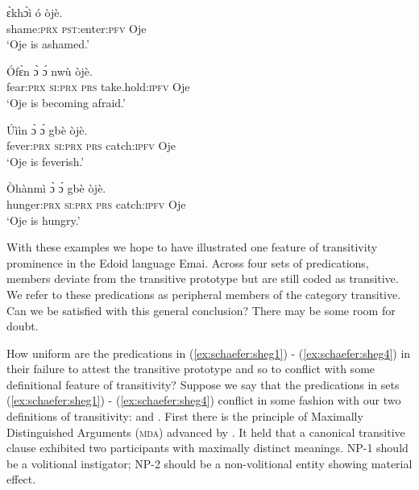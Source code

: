 \documentclass[output=paper,colorlinks,citecolor=brown
]{langscibook}
\begin{document}
\ea \label{ex:schaefer:sheg4}
\begin{xlist}
\ex \label{ex:schaefer:sheg4a}
    \gll ɛ̀khɔ̀ì ó òjè. \\
            shame:\textsc{prx} \textsc{pst}:enter:\textsc{pfv} Oje \\
           \glt  ‘Oje is ashamed.’

    \ex \label{ex:schaefer:sheg4b}
     \gll Ófɛ̀n ɔ̀ ɔ́ nwù òjè. \\
        fear:\textsc{prx}   \textsc{si:prx} \textsc{prs} take.hold:\textsc{ipfv} Oje \\
        \glt ‘Oje is becoming afraid.’

    \ex \label{ex:schaefer:sheg4c}
        \gll Úììn ɔ̀ ɔ́ gbè òjè.
        \\
        fever:\textsc{prx}   \textsc{si:prx} \textsc{prs} catch:\textsc{ipfv} Oje
        \\
        \glt ‘Oje is feverish.’

    \ex \label{ex:schaefer:sheg4d}
        \gll Òhànmì ɔ̀ ɔ́ gbè òjè. 
        \\
        hunger:\textsc{prx}   \textsc{si:prx} \textsc{prs} catch:\textsc{ipfv} Oje
        \\
        \glt ‘Oje is hungry.’   
\end{xlist}
\z	

With these examples we hope to have illustrated one feature of transitivity prominence in the Edoid language Emai. Across four sets of predications, members deviate from the transitive prototype but are still coded as transitive. We refer to these predications as peripheral members of the category transitive. Can we be satisfied with this general conclusion? There may be some room for doubt. 

How uniform are the predications in (\ref{ex:schaefer:sheg1}) - (\ref{ex:schaefer:sheg4}) in their failure to attest the transitive prototype and so to conflict with some definitional feature of transitivity? Suppose we say that the predications in sets (\ref{ex:schaefer:sheg1}) - (\ref{ex:schaefer:sheg4}) conflict in some fashion with our two definitions of transitivity: \citet{Naess2007} and \citet{Haspelmath2015}. First there is the principle of Maximally Distinguished Arguments (\textsc{mda}) advanced by \citet{Naess2007}. It held that a canonical transitive clause exhibited two participants with maximally distinct meanings. NP-1 should be a volitional instigator; NP-2 should be a non-volitional entity showing material effect. 
\end{document}
